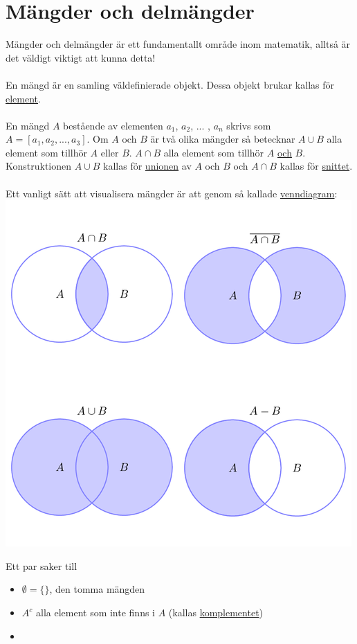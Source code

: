 \chapter{Mängder och delmängder}
Mängder och delmängder är ett fundamentallt område inom matematik,
alltså är det väldigt viktigt att kunna detta!
\\\\
En mängd är en samling väldefinierade objekt.
Dessa objekt brukar kallas för \underline{element}.
\\\\
En mängd $A$ bestående av elementen $a_1$, $a_2$, ... , $a_n$ skrivs som $A=[a_1,a_2, ... ,a_3]$.
Om $A$ och $B$ är två olika mängder så betecknar $A\cup B$ alla element som tillhör $A$ eller $B$.
$A\cap B$ alla element som tillhör $A$ \underline{och} $B$.
Konstruktionen $A\cup B$ kallas för \underline{unionen} av $A$ och $B$ och $A\cap B$ kallas för \underline{snittet}.
\\\\
Ett vanligt sätt att visualisera mängder är att genom så kallade \underline{venndiagram}:\\
\includegraphics[scale=0.5]{lessons/lesson01/imgs/img01.png}
\clearpage

Ett par saker till
\begin{itemize}
    \item $\emptyset=\{\}$, den tomma mängden
    \item $A^c$ alla element som inte finns i $A$ (kallas \underline{komplementet})
    \item
\end{itemize}


